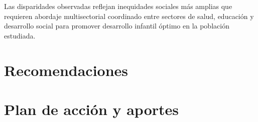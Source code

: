 \documentclass[11pt,letterpaper]{report}
\begin{document}
Las disparidades observadas reflejan inequidades sociales más amplias que 
requieren abordaje multisectorial coordinado entre sectores de salud, educación 
y desarrollo social para promover desarrollo infantil óptimo en la población 
estudiada.

\section{Recomendaciones}
\section{Plan de acción y aportes}

\printbibliography

\appendix







\end{document}
